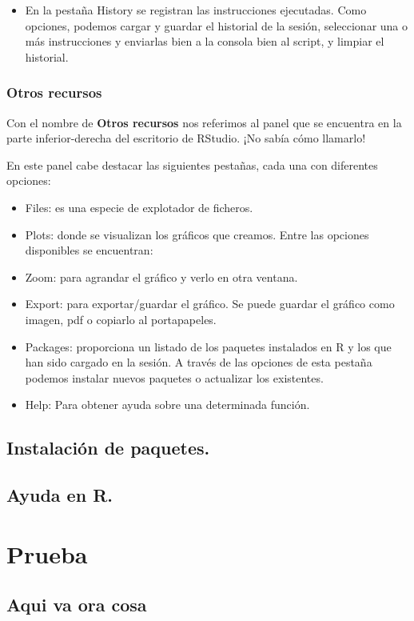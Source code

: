 \documentclass[
]{book}
\providecommand{\tightlist}{%
  \setlength{\itemsep}{0pt}\setlength{\parskip}{0pt}}
\begin{document}
\begin{itemize}
\tightlist
\item
  En la pestaña History se registran las instrucciones ejecutadas. Como opciones, podemos cargar y guardar el historial de la sesión, seleccionar una o más instrucciones y enviarlas bien a la consola bien al script, y limpiar el historial.
\end{itemize}

\hypertarget{otros-recursos}{%
\subsection{Otros recursos}\label{otros-recursos}}

Con el nombre de \textbf{Otros recursos} nos referimos al panel que se encuentra en la parte inferior-derecha del escritorio de RStudio. ¡No sabía cómo llamarlo!

En este panel cabe destacar las siguientes pestañas, cada una con diferentes opciones:

\begin{itemize}
\item
  Files: es una especie de explotador de ficheros.
\item
  Plots: donde se visualizan los gráficos que creamos. Entre las opciones disponibles se encuentran:
\item
  Zoom: para agrandar el gráfico y verlo en otra ventana.
\item
  Export: para exportar/guardar el gráfico. Se puede guardar el gráfico como imagen, pdf o copiarlo al portapapeles.
\item
  Packages: proporciona un listado de los paquetes instalados en R y los que han sido cargado en la sesión. A través de las opciones de esta pestaña podemos instalar nuevos paquetes o actualizar los existentes.
\item
  Help: Para obtener ayuda sobre una determinada función.
\end{itemize}

\hypertarget{instalaciuxf3n-de-paquetes.}{%
\section{Instalación de paquetes.}\label{instalaciuxf3n-de-paquetes.}}

\hypertarget{ayuda-en-r.}{%
\section{Ayuda en R.}\label{ayuda-en-r.}}

\hypertarget{prueba}{%
\chapter{Prueba}\label{prueba}}

\hypertarget{aqui-va-ora-cosa}{%
\section{Aqui va ora cosa}\label{aqui-va-ora-cosa}}

  
\end{document}
